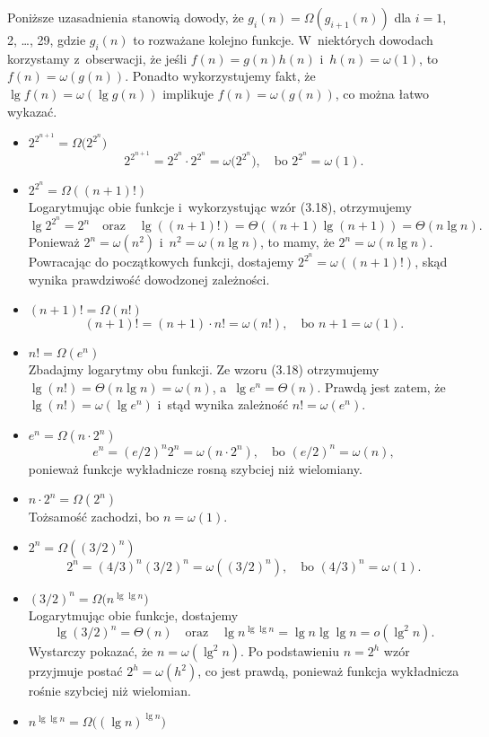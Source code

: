 \subproblem %
Poniższe uzasadnienia stanowią dowody, że $g_i(n)=\Omega(g_{i+1}(n))$ dla $i=1$, 2, \dots, 29, gdzie $g_i(n)$ to rozważane kolejno funkcje.
W~niektórych dowodach korzystamy z~obserwacji, że jeśli $f(n)=g(n)h(n)$ i~$h(n)=\omega(1)$, to $f(n)=\omega(g(n))$.
Ponadto wykorzystujemy fakt, że $\lg f(n)=\omega(\lg g(n))$ implikuje $f(n)=\omega(g(n))$, co można łatwo wykazać.
\begin{itemize}
\item $2^{2^{n+1}}=\Omega\bigl(2^{2^n}\bigr)$
	\[
		2^{2^{n+1}} = 2^{2^n}\cdot2^{2^n} = \omega\bigl(2^{2^n}\bigr), \quad\text{bo $2^{2^n} = \omega(1)$}.
	\]
\item $2^{2^n}=\Omega((n+1)!)$ \\
	Logarytmując obie funkcje i~wykorzystując wzór (3.18), otrzymujemy
	\[
		\lg 2^{2^n} = 2^n \quad\text{oraz}\quad \lg((n+1)!) = \Theta((n+1)\lg(n+1)) = \Theta(n\lg n).
	\]
	Ponieważ $2^n=\omega(n^2)$ i~$n^2=\omega(n\lg n)$, to mamy, że $2^n=\omega(n\lg n)$.
Powracając do początkowych funkcji, dostajemy $2^{2^n}=\omega((n+1)!)$, skąd wynika prawdziwość dowodzonej zależności.
\item $(n+1)!=\Omega(n!)$
	\[
		(n+1)! = (n+1)\cdot n! = \omega(n!), \quad\text{bo $n+1 = \omega(1)$}.
	\]
\item $n!=\Omega(e^n)$ \\
	Zbadajmy logarytmy obu funkcji.
Ze wzoru (3.18) otrzymujemy $\lg(n!)=\Theta(n\lg n)=\omega(n)$, a~$\lg e^n=\Theta(n)$.
Prawdą jest zatem, że $\lg(n!)=\omega(\lg e^n)$ i~stąd wynika zależność $n!=\omega(e^n)$.
\item $e^n=\Omega(n\cdot2^n)$
	\[
		e^n = (e/2)^n2^n = \omega(n\cdot2^n), \quad\text{bo $(e/2)^n = \omega(n)$},
	\]
	ponieważ funkcje wykładnicze rosną szybciej niż wielomiany.
\item $n\cdot2^n=\Omega(2^n)$ \\
	Tożsamość zachodzi, bo $n=\omega(1)$.
\item $2^n=\Omega((3/2)^n)$
	\[
		2^n = (4/3)^n(3/2)^n = \omega((3/2)^n), \quad\text{bo $(4/3)^n = \omega(1)$}.
	\]
\item $(3/2)^n=\Omega\bigl(n^{\lg\lg n}\bigr)$ \\
	Logarytmując obie funkcje, dostajemy
	\[
		\lg(3/2)^n = \Theta(n) \quad\text{oraz}\quad \lg n^{\lg\lg n} = \lg n\lg\lg n = o(\lg^2n).
	\]
	Wystarczy pokazać, że $n=\omega(\lg^2n)$.
Po podstawieniu $n=2^h$ wzór przyjmuje postać $2^h=\omega(h^2)$, co jest prawdą, ponieważ funkcja wykładnicza rośnie szybciej niż wielomian.
\item $n^{\lg\lg n}=\Omega\bigl((\lg n)^{\lg n}\bigr)$ \\

\end{itemize}
